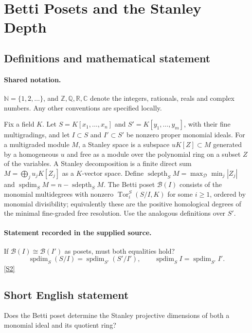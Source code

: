 \documentclass[11pt]{article}
\newcommand{\sref}[2]{\hyperlink{source:#1:#2}{[S#2]}}
\begin{document}
\section{Betti Posets and the Stanley Depth}\label{statement}

\subsection{Definitions and mathematical statement}

\paragraph{Shared notation.}$\mathbb N=\{1,2,\ldots\}$, and $\mathbb Z,\mathbb Q,\mathbb R,\mathbb C$ denote the integers, rationals, reals and complex numbers. Any other conventions are specified locally.


Fix a field $K$. Let $S=K[x_1,\ldots,x_n]$ and $S'=K[y_1,\ldots,y_m]$, with their fine multigradings, and let $I\subset S$ and $I'\subset S'$ be nonzero proper monomial ideals. For a multigraded module $M$, a Stanley space is a subspace $uK[Z]\subset M$ generated by a homogeneous $u$ and free as a module over the polynomial ring on a subset $Z$ of the variables. A Stanley decomposition is a finite direct sum $M=\bigoplus_j u_jK[Z_j]$ as a $K$-vector space. Define $\operatorname{sdepth}_S M=\max_{\mathcal D}\min_j|Z_j|$ and $\operatorname{spdim}_S M=n-\operatorname{sdepth}_S M$. The Betti poset $\mathcal B(I)$ consists of the monomial multidegrees with nonzero $\operatorname{Tor}_i^S(S/I,K)$ for some $i\ge1$, ordered by monomial divisibility; equivalently these are the positive homological degrees of the minimal fine-graded free resolution. Use the analogous definitions over $S'$.
\paragraph{Statement recorded in the supplied source.}
If $\mathcal B(I)\cong\mathcal B(I')$ as posets, must both equalities hold? \[\operatorname{spdim}_S(S/I)=\operatorname{spdim}_{S'}(S'/I'),\qquad \operatorname{spdim}_S I=\operatorname{spdim}_{S'}I'.\] \sref{statement}{2}
\subsection{Short English statement}
Does the Betti poset determine the Stanley projective dimensions of both a monomial ideal and its quotient ring?
\end{document}
